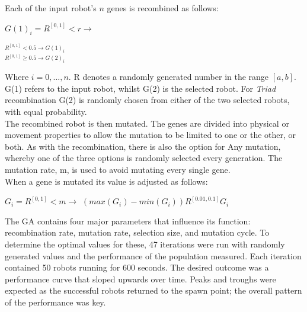 \documentclass{article}
\begin{document}
Each of the input robot's $n$ genes is recombined as follows:
\begin{center}
\begin{Large}
$G(1)_{i} = R^{[0, 1]} < r \longrightarrow$ 
\begin{LARGE}
$^{R^{[0, 1]} < 0.5\longrightarrow G(1)_{i}} 
_{R^{[0, 1]} \geq 0.5 \longrightarrow G(2)_{i}}$
\end{LARGE}
\end{Large}
\end{center}

Where $i = 0, ..., n$. R denotes a randomly generated number in the range $[a, b]$. G(1) refers to the input robot, whilst G(2) is the selected robot. For \textit{Triad} recombination G(2) is randomly chosen from either of the two selected robots, with equal probability.
\\[1\baselineskip]
The recombined robot is then mutated. The genes are divided into physical or movement properties to allow the mutation to be limited to one or the other, or both. As with the recombination, there is also the option for Any mutation, whereby one of the three options is randomly selected every generation. 
The mutation rate, m, is used to avoid mutating every single gene.\\
When a gene is mutated its value is adjusted as follows:
\begin{center}
\begin{Large}
$G_{i} = R^{[0, 1]} < m \longrightarrow $
$(max(G_{i}) - min(G_{i})) R^{[0.01, 0.1]}  G_{i}$\\[1\baselineskip]
\end{Large}
\end{center}
The GA contains four major parameters that influence its function: recombination rate, mutation rate, selection size, and mutation cycle. To determine the optimal values for these, 47 iterations were run with randomly generated values and the performance of the population measured. Each iteration contained 50 robots running for 600 seconds.
The desired outcome was a performance curve that sloped upwards over time. Peaks and troughs were expected as the successful robots returned to the spawn point; the overall pattern of the performance was key. 
\end{document}
